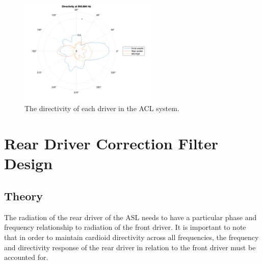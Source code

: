 \documentclass{report}
\begin{document}
        \begin{figure}[H]
            \centering
            \hspace{2cm} \includegraphics[width = 0.6\textwidth]{figs/initialDirectivity.png}
            \caption{The directivity of each driver in the ACL system.}
            \label{initialDirectivity}
        \end{figure}



    \section{Rear Driver Correction Filter Design}
        \subsection{Theory}
            The radiation of the rear driver of the ASL needs to have a particular phase and frequency relationship to radiation of the front driver.
            It is important to note that in order to maintain cardioid directivity across all frequencies, the frequency and directivity response of the rear driver in relation to the front driver must be accounted for.
\end{document}
